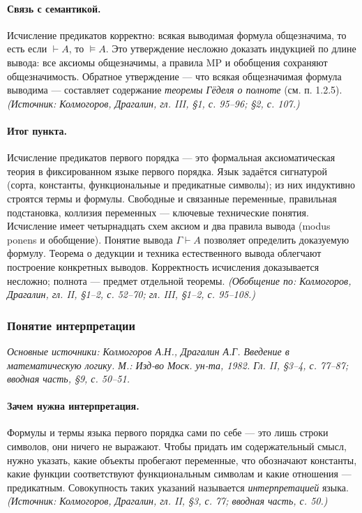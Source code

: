 \documentclass[a4paper,12pt]{article}
\begin{document}
\paragraph{Связь с семантикой.} Исчисление предикатов корректно: всякая выводимая формула общезначима, то есть если \(\vdash A\), то \(\models A\). Это утверждение несложно доказать индукцией по длине вывода: все аксиомы общезначимы, а правила MP и обобщения сохраняют общезначимость. Обратное утверждение — что всякая общезначимая формула выводима — составляет содержание \emph{теоремы Гёделя о полноте} (см. п. 1.2.5).
\textit{(Источник: Колмогоров, Драгалин, гл. III, §1, с. 95--96; §2, с. 107.)}

\paragraph{Итог пункта.} Исчисление предикатов первого порядка — это формальная аксиоматическая теория в фиксированном языке первого порядка. Язык задаётся сигнатурой (сорта, константы, функциональные и предикатные символы); из них индуктивно строятся термы и формулы. Свободные и связанные переменные, правильная подстановка, коллизия переменных — ключевые технические понятия. Исчисление имеет четырнадцать схем аксиом и два правила вывода (modus ponens и обобщение). Понятие вывода \(\Gamma\vdash A\) позволяет определить доказуемую формулу. Теорема о дедукции и техника естественного вывода облегчают построение конкретных выводов. Корректность исчисления доказывается несложно; полнота — предмет отдельной теоремы.
\textit{(Обобщение по: Колмогоров, Драгалин, гл. II, §1--2, с. 52--70; гл. III, §1--2, с. 95--108.)}

\subsubsection{Понятие интерпретации}

\noindent\textit{Основные источники: Колмогоров А.Н., Драгалин А.Г. Введение в математическую логику. М.: Изд-во Моск. ун-та, 1982. Гл. II, §3--4, с. 77--87; вводная часть, §9, с. 50--51.}

\paragraph{Зачем нужна интерпретация.} Формулы и термы языка первого порядка сами по себе --- это лишь строки символов, они ничего не выражают. Чтобы придать им содержательный смысл, нужно указать, какие объекты пробегают переменные, что обозначают константы, какие функции соответствуют функциональным символам и какие отношения --- предикатным. Совокупность таких указаний называется \emph{интерпретацией} языка.
\textit{(Источник: Колмогоров, Драгалин, гл. II, §3, с. 77; вводная часть, с. 50.)}
\end{document}
